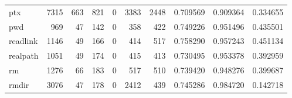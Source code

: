 \begin{longtable}{lrrrrrrrrr}
ptx       &                                7315 &                                             663 &                                            821 &                                             0 &                                           3383 &                                         2448 &                                           0.709569 &                               0.909364 &                             0.334655 \\
pwd       &                                 969 &                                              47 &                                            142 &                                             0 &                                            358 &                                          422 &                                           0.749226 &                               0.951496 &                             0.435501 \\
readlink  &                                1146 &                                              49 &                                            166 &                                             0 &                                            414 &                                          517 &                                           0.758290 &                               0.957243 &                             0.451134 \\
realpath  &                                1051 &                                              49 &                                            174 &                                             0 &                                            415 &                                          413 &                                           0.730495 &                               0.953378 &                             0.392959 \\
rm        &                                1276 &                                              66 &                                            183 &                                             0 &                                            517 &                                          510 &                                           0.739420 &                               0.948276 &                             0.399687 \\
rmdir     &                                3076 &                                              47 &                                            178 &                                             0 &                                           2412 &                                          439 &                                           0.745286 &                               0.984720 &                             0.142718 \\

\end{longtable}
